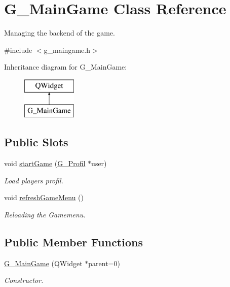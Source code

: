 \hypertarget{class_g___main_game}{}\section{G\+\_\+\+Main\+Game Class Reference}
\label{class_g___main_game}


Managing the backend of the game.  




{\ttfamily \#include $<$g\+\_\+maingame.\+h$>$}

Inheritance diagram for G\+\_\+\+Main\+Game\+:\begin{figure}[H]
\begin{center}
\leavevmode
\includegraphics[height=2.000000cm]{class_g___main_game}
\end{center}
\end{figure}
\subsection*{Public Slots}
\begin{DoxyCompactItemize}
\item 
void \hyperlink{class_g___main_game_aaa438c63b4e0f9696ab39edd65748d67}{start\+Game} (\hyperlink{class_g___profil}{G\+\_\+\+Profil} $\ast$user)
\begin{DoxyCompactList}\small\item\em Load player\textquotesingle{}s profil. \end{DoxyCompactList}\item 
\hypertarget{class_g___main_game_affeaf42be6e712423483c31b01ebb0a8}{}void \hyperlink{class_g___main_game_affeaf42be6e712423483c31b01ebb0a8}{refresh\+Game\+Menu} ()\label{class_g___main_game_affeaf42be6e712423483c31b01ebb0a8}

\begin{DoxyCompactList}\small\item\em Reloading the Gamemenu. \end{DoxyCompactList}\end{DoxyCompactItemize}
\subsection*{Public Member Functions}
\begin{DoxyCompactItemize}
\item 
\hyperlink{class_g___main_game_a6fd96da20870aaac75975e435b80d1ae}{G\+\_\+\+Main\+Game} (Q\+Widget $\ast$parent=0)
\begin{DoxyCompactList}\small\item\em Constructor. \end{DoxyCompactList}\end{DoxyCompactItemize}


